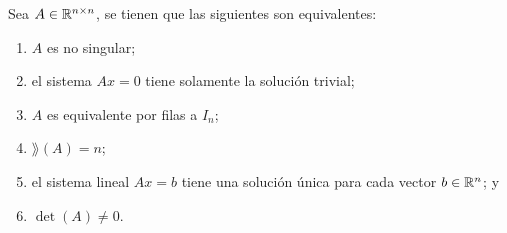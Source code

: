 \documentclass[a4,11pt]{aleph-notas}
\begin{document}
\begin{teo}
    
    Sea $A \in \Mat[\R]{n}{n}$, se tienen que las siguientes son equivalentes:
    \begin{enumerate}
    \item 
        $A$ es no singular;
    \item 
        el sistema $Ax=0$ tiene solamente la solución trivial;
    \item 
        $A$ es equivalente por filas a $I_n$;
    \item 
        $\rang(A)=n$; 
    \item 
        el sistema lineal $Ax=b$ tiene una solución única para cada vector $b \in \R^{n}$; y
    \item 
        $\det(A) \neq 0$.
    \end{enumerate}
\end{teo}
\end{document}
